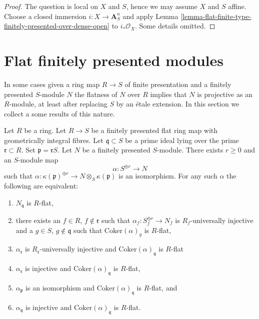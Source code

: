 \begin{proof}
The question is local on $X$ and $S$, hence we may assume $X$ and
$S$ affine. Choose a closed immersion $i : X \to \mathbf{A}^n_S$
and apply
Lemma \ref{lemma-flat-finite-type-finitely-presented-over-dense-open}
to $i_*\mathcal{O}_X$. Some details omitted.
\end{proof}





\section{Flat finitely presented modules}
\label{section-finitely-presented-flat}

\noindent
In some cases given a ring map $R \to S$ of finite presentation and
a finitely presented $S$-module $N$ the flatness of $N$ over $R$ implies
that $N$ is projective as an $R$-module, at least after replacing $S$
by an \'etale extension. In this section we collect a some results
of this nature.

\begin{lemma}
\label{lemma-induction-step-fp}
Let $R$ be a ring. Let $R \to S$ be a finitely presented
flat ring map with geometrically integral fibres. Let
$\mathfrak q \subset S$ be a prime ideal lying over the prime
$\mathfrak r \subset R$. Set $\mathfrak p = \mathfrak r S$.
Let $N$ be a finitely presented $S$-module.
There exists $r \geq 0$ and an $S$-module map
$$
\alpha : S^{\oplus r} \longrightarrow N
$$
such that
$\alpha : \kappa(\mathfrak p)^{\oplus r} \to N \otimes_S \kappa(\mathfrak p)$
is an isomorphism. For any such $\alpha$ the following are equivalent:
\begin{enumerate}
\item $N_{\mathfrak q}$ is $R$-flat,
\item there exists an $f \in R$, $f \not \in \mathfrak r$ such that
$\alpha_f : S_f^{\oplus r} \to N_f$ is $R_f$-universally injective and
a $g \in S$, $g \not \in \mathfrak q$ such that $\text{Coker}(\alpha)_g$
is $R$-flat,
\item $\alpha_{\mathfrak r}$ is $R_{\mathfrak r}$-universally injective and
$\text{Coker}(\alpha)_{\mathfrak q}$ is $R$-flat
\item $\alpha_{\mathfrak r}$ is injective and
$\text{Coker}(\alpha)_{\mathfrak q}$ is $R$-flat,
\item $\alpha_{\mathfrak p}$ is an isomorphism and
$\text{Coker}(\alpha)_{\mathfrak q}$ is $R$-flat, and
\item $\alpha_{\mathfrak q}$ is injective and
$\text{Coker}(\alpha)_{\mathfrak q}$ is $R$-flat.
\end{enumerate}
\end{lemma}


